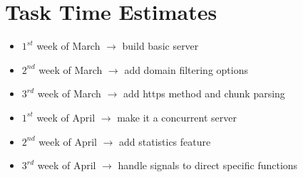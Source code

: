 \documentclass{article}
\begin{document}
\section*{Task Time Estimates}
\begin{itemize}
    \item $1^{st}$ week of March \hspace{2mm}$\longrightarrow$ \hspace{2mm} build basic server
    \item $2^{nd}$ week of March \hspace{1mm}$\longrightarrow$ \hspace{2mm} add domain filtering options
    \item $3^{rd}$ week of March \hspace{1.2mm}$\longrightarrow$ \hspace{2mm} add https method and chunk parsing
    \item $1^{st}$ week of April \hspace{3mm}$\longrightarrow$ \hspace{2mm} make it a concurrent server
    \item $2^{nd}$ week of April \hspace{3mm}$\longrightarrow$ \hspace{2mm} add statistics feature
    \item $3^{rd}$ week of April \hspace{3mm}$\longrightarrow$ \hspace{2mm} handle signals to direct specific functions
\end{itemize}
\end{document}
